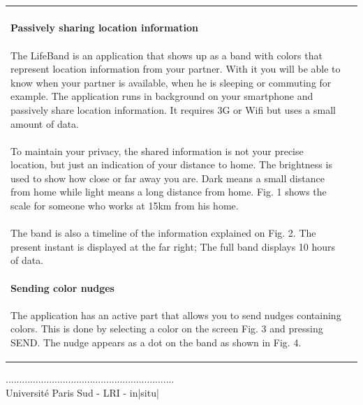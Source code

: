 \documentclass[11pt]{article}
\begin{document}
\begin{tabular}{p{6.5cm}p{10cm}}
\paragraph{Passively sharing location information}
\paragraph{} The LifeBand is an application that shows up as a band with colors that represent location information from your partner. With it you will be able to know when your partner is available, when he is sleeping or commuting for example. The application runs in background on your smartphone and passively share location information. It requires 3G or Wifi but uses a small amount of data.
\paragraph{} To maintain your privacy, the shared information is not your precise location, but just an indication of your distance to home. The brightness is used to show how close or far away you are. Dark means a small distance from home while light means a long distance from home. Fig. 1 shows the scale for someone who works at 15km from his home.
\paragraph{} The band is also a timeline of the information explained on Fig. 2. The present instant is displayed at the far right; The full band displays 10 hours of data.

\paragraph{Sending color nudges}
\paragraph{} The application has an active part that allows you to send nudges containing colors. This is done by selecting a color on the screen Fig. 3 and pressing SEND. The nudge appears as a dot on the band as shown in Fig. 4.

\end{tabular}
\vfill
\begin{center}
.............................................................. \\
Université Paris Sud - LRI - in|situ|
\end{center}
\end{document}
